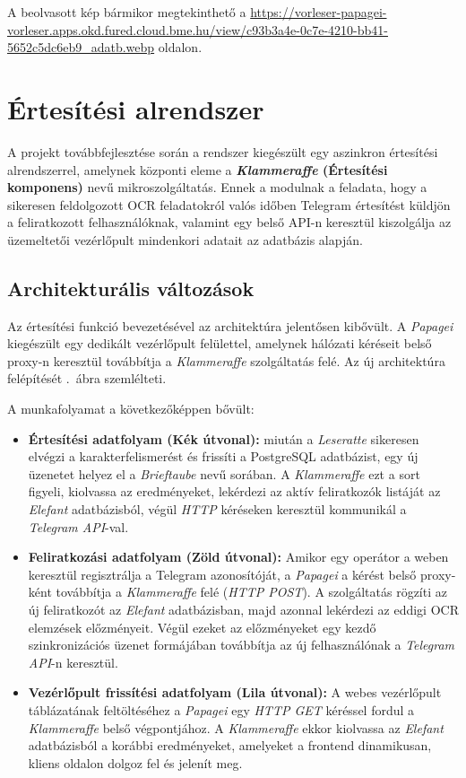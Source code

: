 \documentclass[12pt]{article}
\begin{document}
	A beolvasott kép bármikor megtekinthető a \url{https://vorleser-papagei-vorleser.apps.okd.fured.cloud.bme.hu/view/c93b3a4e-0c7e-4210-bb41-5652c5dc6eb9_adatb.webp} oldalon.
	
	\section{Értesítési alrendszer}
	
	A projekt továbbfejlesztése során a rendszer kiegészült egy aszinkron értesítési alrendszerrel, amelynek központi eleme a \textbf{\textit{Klammeraffe} (Értesítési komponens)} nevű mikroszolgáltatás. Ennek a modulnak a feladata, hogy a sikeresen feldolgozott OCR feladatokról valós időben Telegram értesítést küldjön a feliratkozott felhasználóknak, valamint egy belső API-n keresztül kiszolgálja az üzemeltetői vezérlőpult mindenkori adatait az adatbázis alapján. 
	
	\subsection{Architekturális változások}
	
	Az értesítési funkció bevezetésével az architektúra jelentősen kibővült. A \textit{Papagei} kiegészült egy dedikált vezérlőpult felülettel, amelynek hálózati kéréseit belső proxy-n keresztül továbbítja a \textit{Klammeraffe} szolgáltatás felé. Az új architektúra felépítését .\ ábra szemlélteti.
	
	A munkafolyamat a következőképpen bővült:
	\begin{itemize}
		\item \textbf{Értesítési adatfolyam (Kék útvonal):} miután a \textit{Leseratte} sikeresen elvégzi a karakterfelismerést és frissíti a PostgreSQL adatbázist, egy új üzenetet helyez el a \textit{Brieftaube}  nevű sorában. A \textit{Klammeraffe} ezt a sort figyeli, kiolvassa az eredményeket, lekérdezi az aktív feliratkozók listáját az \textit{Elefant} adatbázisból, végül \textit{HTTP} kéréseken keresztül kommunikál a \textit{Telegram API}-val.
		
		\item \textbf{Feliratkozási adatfolyam (Zöld útvonal):} Amikor egy operátor a weben keresztül regisztrálja a Telegram azonosítóját, a \textit{Papagei} a kérést belső proxy-ként továbbítja a \textit{Klammeraffe} felé (\textit{HTTP POST}). A szolgáltatás rögzíti az új feliratkozót az \textit{Elefant} adatbázisban, majd azonnal lekérdezi az eddigi OCR elemzések előzményeit. Végül ezeket az előzményeket egy kezdő szinkronizációs üzenet formájában továbbítja az új felhasználónak a \textit{Telegram API}-n keresztül.
		
		\item \textbf{Vezérlőpult frissítési adatfolyam (Lila útvonal):} A webes vezérlőpult táblázatának feltöltéséhez a \textit{Papagei} egy \textit{HTTP GET} kéréssel fordul a \textit{Klammeraffe} belső  végpontjához. A \textit{Klammeraffe} ekkor kiolvassa az \textit{Elefant} adatbázisból a korábbi eredményeket, amelyeket a frontend dinamikusan, kliens oldalon dolgoz fel és jelenít meg.
	\end{itemize}
	
\end{document}
